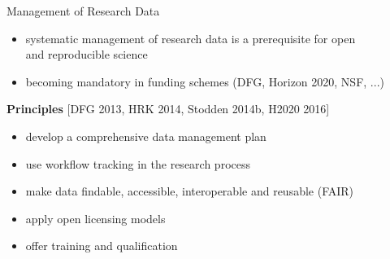 \documentclass{intbeamer}
\begin{document}
\begin{frame}{Management of Research Data}

\begin{itemize}
\item systematic management of research data is a prerequisite for open \\ and reproducible science
\item becoming mandatory in funding schemes (DFG, Horizon 2020, NSF, ...)
\end{itemize}

\vfill

\textbf{Principles} {\tiny [DFG 2013, HRK 2014, Stodden 2014b, H2020 2016]}
\begin{itemize}
\item develop a comprehensive data management plan
\item use workflow tracking in the research process
\item make data findable, accessible, interoperable and reusable (FAIR)
\item apply open licensing models
\item offer training and qualification
\end{itemize}

\end{frame}
\end{document}
